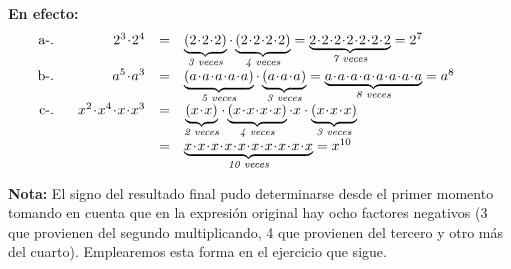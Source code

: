 \noindent\textbf{En efecto:}
\vspace*{-0.05cm}
\begingroup
\renewcommand{\arraystretch}{1.75}%
\[
\begin{array}{@{}l rcl@{}}
\makebox[0pt][r]{\text{a-. }\;} & 2^{3}\!\cdot\! 2^{4} & = &
  \underbrace{(2\!\cdot\!2\!\cdot\!2)}_{\textit{3 veces}}
  \cdot \underbrace{(2\!\cdot\!2\!\cdot\!2\!\cdot\!2)}_{\textit{4 veces}}
  = \underbrace{2\!\cdot\!2\!\cdot\!2\!\cdot\!2\!\cdot\!2\!\cdot\!2\!\cdot\!2}_{\textit{7 veces}}
  = 2^{7} \\

\makebox[0pt][r]{\text{b-. }\;} & a^{5}\!\cdot\! a^{3} & = &
  \underbrace{(a\!\cdot\!a\!\cdot\!a\!\cdot\!a\!\cdot\!a)}_{\textit{5 veces}}
  \cdot \underbrace{(a\!\cdot\!a\!\cdot\!a)}_{\textit{3 veces}}
  = \underbrace{a\!\cdot\!a\!\cdot\!a\!\cdot\!a\!\cdot\!a\!\cdot\!a\!\cdot\!a\!\cdot\!a}_{\textit{8 veces}}
  = a^{8} \\

\makebox[0pt][r]{\text{c-. }\;} & x^{2}\!\cdot\! x^{4}\!\cdot\! x\!\cdot\! x^{3} & = &
  \underbrace{(x\!\cdot\!x)}_{\textit{2 veces}}
  \cdot \underbrace{(x\!\cdot\!x\!\cdot\!x\!\cdot\!x)}_{\textit{4 veces}}
  \cdot x \cdot \underbrace{(x\!\cdot\!x\!\cdot\!x)}_{\textit{3 veces}} \\[.2ex]
& & = & \underbrace{x\!\cdot\!x\!\cdot\!x\!\cdot\!x\!\cdot\!x\!\cdot\!x\!\cdot\!x\!\cdot\!x\!\cdot\!x\!\cdot\!x}_{\textit{10 veces}}
  = x^{10}
\end{array}
\]
\endgroup







\textbf{Nota:} El signo del resultado final pudo determinarse desde el primer momento tomando en cuenta que en 
la expresión original hay ocho factores negativos (3 que provienen del segundo multiplicando, 4 que provienen del 
tercero y otro más del cuarto). Emplearemos esta forma en el ejercicio que sigue.



